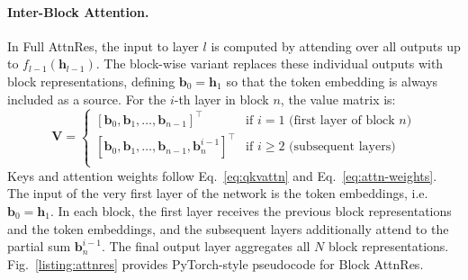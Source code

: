 \paragraph{Inter-Block Attention.}
In Full AttnRes, the input to layer $l$ is computed by attending over all outputs up to $f_{l-1}(\bm{h}_{l-1})$.
The block-wise variant replaces these individual outputs with block representations, defining $\bm{b}_0 = \bm{h}_1$ so that the token embedding is always included as a source.
For the $i$-th layer in block $n$, the value matrix is:
\begin{equation}
    \mathbf{V} = \begin{cases}
        [\bm{b}_0, \bm{b}_1, \ldots, \bm{b}_{n-1}]^\top                 & \text{if } i = 1 \text{ (first layer of block } n\text{)} \\
        [\bm{b}_0, \bm{b}_1, \ldots, \bm{b}_{n-1}, \bm{b}_n^{i-1}]^\top & \text{if } i \geq 2 \text{ (subsequent layers)}           \\
    \end{cases}
\end{equation}
Keys and attention weights follow Eq.~\ref{eq:qkvattn} and Eq.~\ref{eq:attn-weights}.
The input of the very first layer of the network is the token embeddings, i.e. $\bm{b}_0 = \bm{h}_1$. In each block, the first layer receives the previous block representations and the token embeddings, and the subsequent layers additionally attend to the partial sum $\bm{b}_n^{i-1}$. The final output layer aggregates all $N$ block representations.
Fig.~\ref{listing:attnres} provides PyTorch-style pseudocode for Block AttnRes.
\renewcommand{\theFancyVerbLine}{\ttfamily\textcolor[rgb]{0.5,0.5,0.5}{\scriptsize\arabic{FancyVerbLine}}}

